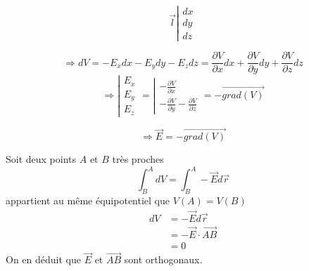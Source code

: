 \documentclass[../main.tex]{subfile}
\begin{document}
$$\vec{l} 
\left|
\begin{array}{l}
	dx\\
	dy\\
	dz
\end{array}
\right.$$

$$\Rightarrow dV = - E_xdx - E_ydy - E_zdz = \frac{\partial V}{\partial x}dx + \frac{\partial V}{\partial y}dy + \frac{\partial V}{\partial z}dz$$
$$\Rightarrow 
\left|
\begin{array}{l}
	E_x\\
	E_y\\
	E_z
\end{array}
\right.
= 
\left|
\begin{array}{l}
	-\frac{\partial V}{\partial x}\\
	-\frac{\partial V}{\partial y}
	-\frac{\partial V}{\partial z}
\end{array}
\right.
= 
-\vec{grad(V)}
$$

$$\Rightarrow \vec{E} = -\vec{grad(V)}$$

\begin{rema}
	Soit deux points $A$ et $B$ très proches\\
	$$\int_B^A dV = \int_B^A -\vec{E} d\vec{r}$$
	appartient au même équipotentiel que $V(A) = V(B)$
	$$
\begin{aligned}
	dV &= -\vec{E} d\vec{r}\\
	&= -\vec{E} \cdot \vec{AB}\\
	&= 0
\end{aligned}
	$$
	On en déduit que $\vec{E}$ et $\vec{AB}$ sont orthogonaux.
\end{rema}
\end{document}
